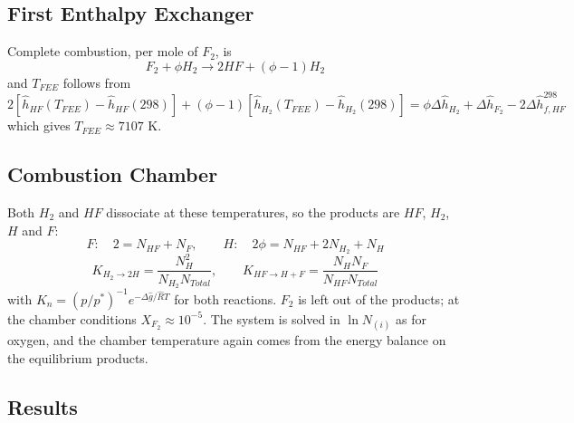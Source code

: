 \documentclass[12pt, Times New Roman]{article}
\begin{document}
    \subsection{First Enthalpy Exchanger}

    Complete combustion, per mole of $F_{2}$, is
    \begin{equation}
        F_{2} + \phi H_{2} \rightarrow 2HF + (\phi - 1)H_{2}
    \end{equation}
    and $T_{FEE}$ follows from
    \begin{equation}
        2\left[\hat{h}_{HF}(T_{FEE}) - \hat{h}_{HF}(298)\right] + (\phi-1)\left[\hat{h}_{H_{2}}(T_{FEE}) - \hat{h}_{H_{2}}(298)\right]
        = \phi\Delta\hat{h}_{H_{2}} + \Delta\hat{h}_{F_{2}} - 2\Delta\hat{h}^{298}_{f,HF}
    \end{equation}
    which gives $T_{FEE} \approx 7107$ K.

    \subsection{Combustion Chamber}

    Both $H_{2}$ and $HF$ dissociate at these temperatures, so the products are $HF$, $H_{2}$, $H$ and $F$:
    \begin{equation}
        F: \quad 2 = N_{HF} + N_{F}, \qquad H: \quad 2\phi = N_{HF} + 2N_{H_{2}} + N_{H}
    \end{equation}
    \begin{equation}
        K_{H_{2} \rightarrow 2H} = \frac{N_{H}^{2}}{N_{H_{2}} N_{Total}}, \qquad
        K_{HF \rightarrow H + F} = \frac{N_{H} N_{F}}{N_{HF} N_{Total}}
    \end{equation}
    with $K_{n} = (p/p^{*})^{-1} e^{-\Delta \hat{g}/\hat{R}T}$ for both reactions. $F_{2}$ is left out of the products;
    at the chamber conditions $X_{F_{2}} \approx 10^{-5}$. The system is solved in $\ln N_{(i)}$ as for oxygen, and the
    chamber temperature again comes from the energy balance on the equilibrium products.

    \subsection{Results}
\end{document}
